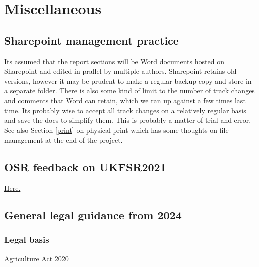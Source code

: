 \documentclass[
]{book}
\begin{document}
\hypertarget{appendix-appendix}{%
\appendix}


\hypertarget{miscellaneous}{%
\chapter{Miscellaneous}\label{miscellaneous}}

\hypertarget{sharepoint-management-practice}{%
\section{Sharepoint management practice}\label{sharepoint-management-practice}}

Its assumed that the report sections will be Word documents hosted on Sharepoint and edited in prallel by multiple authors. Sharepoint retains old versions, however it may be prudent to make a regular backup copy and store in a separate folder. There is also some kind of limit to the number of track changes and comments that Word can retain, which we ran up against a few times last time. Its probably wise to accept all track changes on a relatively regular basis and save the docs to simplify them. This is probably a matter of trial and error. See also Section \ref{print} on physical print which has some thoughts on file management at the end of the project.

\hypertarget{osr-feedback-on-ukfsr2021}{%
\section{OSR feedback on UKFSR2021}\label{osr-feedback-on-ukfsr2021}}

\href{https://osr.statisticsauthority.gov.uk/correspondence/mark-pont-to-ian-lonsdale-united-kingdom-food-security-report/}{Here.}

\hypertarget{general-legal-guidance-from-2024}{%
\section{General legal guidance from 2024}\label{general-legal-guidance-from-2024}}

\hypertarget{legal-basis}{%
\subsection{Legal basis}\label{legal-basis}}

\href{https://www.legislation.gov.uk/ukpga/2020/21/part/2/chapter/1/enacted}{Agriculture Act 2020}
\end{document}
